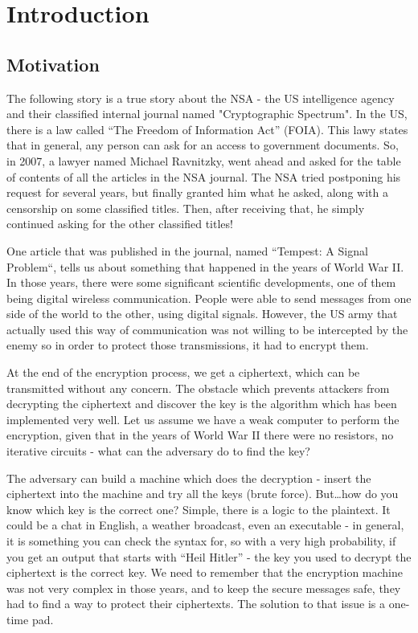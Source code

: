 \chapter{Introduction} \label{chap:c1_IntroductionAOI}

\section{Motivation} \label{sec:Motivation} %

The following story is a true story about the NSA - the US intelligence agency
and their classified internal journal named "Cryptographic Spectrum".
In the US, there is a law called ``The Freedom of Information Act'' (FOIA). This lawy states that in general, any person can ask for an access to government documents.
So, in 2007, a lawyer named Michael Ravnitzky, went ahead and asked for the table of
contents of all the articles in the NSA journal. The NSA tried postponing his request for several years, but finally granted him what he asked, along with a censorship on some classified titles. Then, after receiving that, he simply continued asking for the other classified titles!

One article that was published in the journal, named ``Tempest: A Signal Problem``,
tells us about something that happened in the years of World War II. In those years,
there were some significant scientific developments, one of them being digital wireless
communication. People were able to send messages from one side of the world to the other, using digital signals. However, the US army that actually used this way of communication was not willing to be intercepted by the enemy so in order to protect those transmissions, it had to encrypt them. 

At the end of the encryption process, we get a ciphertext, which can be
transmitted without any concern. The obstacle which prevents attackers from
decrypting the ciphertext and discover the key is the algorithm which has been
implemented very well. Let us assume we have a weak computer to perform the
encryption, given that in the years of World War II there were no resistors, no
iterative circuits - what can the adversary do to find the key?

The adversary can build a machine which does the decryption - insert the
ciphertext into the machine and try all the keys (brute force). But\ldots how do
you know which key is the correct one? Simple, there is a logic to the plaintext.
It could be a chat in English, a weather broadcast, even an executable - in general, it is
something you can check the syntax for, so with a very high probability, if you get
an output that starts with ``Heil Hitler'' -  the key you used to decrypt the
ciphertext is the correct key. We need to remember that the encryption machine
was not very complex in those years, and to keep the secure messages safe, they
had to find a way to protect their ciphertexts. The solution to that issue is a
one-time pad.

